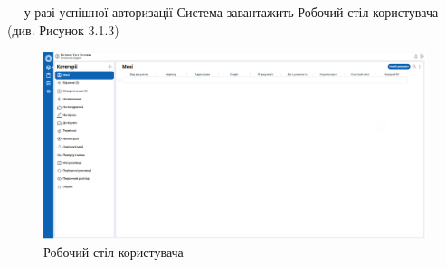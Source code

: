--- у разі успішної авторизації Система завантажить Робочий стіл користувача (див. Рисунок 3.1.3)

\begin{figure}[!htbp]
\centerline{\includegraphics[width=\textwidth]{img/3.1.3.png}}
\caption{Робочий стіл користувача}
\end{figure}

